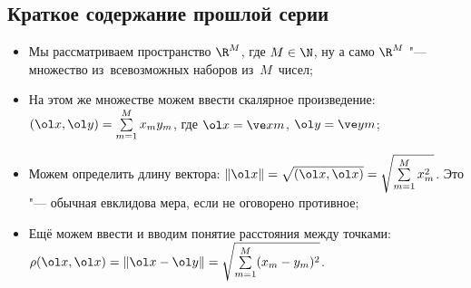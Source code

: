 \documentclass[a4paper,10pt,twoside]{article}
\begin{document}
	 \subsection{Краткое содержание прошлой серии}
	 \begin{itemize}
	   \item  Мы рассматриваем пространство $\R^M$, где $M\in\N$, ну а само $\R^M$ "--- множество из~всевозможных наборов из~$M$~чисел;
	   \item  На этом же множестве можем ввести скалярное произведение: $(\ol x,\ol y) = \sum\limits_{m=1}^Mx_my_m$, где 
	 $\ol x = \ve xm$, $\ol y = \ve ym$;
	   \item  Можем определить длину вектора: $\|\ol x\| = \sqrt{(\ol x,\ol x)} = \sqrt{\sum\limits_{m=1}^M x_m^2}$. Это "--- обычная
	 евклидова мера, если не оговорено противное;
	   \item  Ещё можем ввести и вводим понятие расстояния между точками: $\rho(\ol x,\ol x) = \|\ol x - \ol y\| = \sqrt{\sum\limits_{m=1}^M(x_m - y_m)^2}$. 
	 \end{itemize}
\end{document}

